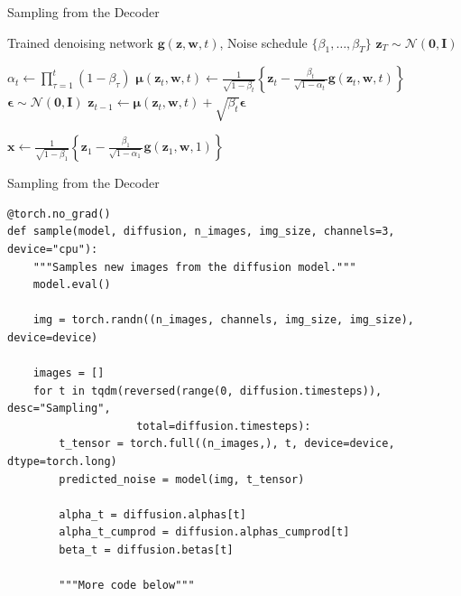\documentclass[aspectratio=169,xcolor=dvipsnames]{beamer}
\theoremstyle{named}
\newcommand{\modelg}{\mathbf{g}}
\begin{document}
\begin{frame}{Sampling from the Decoder}

\begin{algorithmic}[1]
    \Require Trained denoising network $\modelg(\mathbf{z}, \mathbf{w}, t)$, Noise schedule $\{\beta_1, \dots, \beta_T\}$
    \State $\mathbf{z}_T \sim \mathcal{N}(\mathbf{0}, \mathbf{I})$ 

    \Statex

        \State $\alpha_t \gets \prod_{\tau=1}^{t} (1 - \beta_\tau)$ 
        \Statex {}
        \State $\boldsymbol{\mu}(\mathbf{z}_t, \mathbf{w}, t) \gets \frac{1}{\sqrt{1-\beta_t}}\left\{\mathbf{z}_t - \frac{\beta_t}{\sqrt{1-\alpha_t}}\modelg(\mathbf{z}_t, \mathbf{w}, t)\right\}$
        \State $\boldsymbol{\epsilon} \sim \mathcal{N}(\mathbf{0}, \mathbf{I})$ 
        \State $\mathbf{z}_{t-1} \gets \boldsymbol{\mu}(\mathbf{z}_t, \mathbf{w}, t) + \sqrt{\beta_t}\boldsymbol{\epsilon}$ 
    \EndFor

    \Statex

    \State $\mathbf{x} \gets \frac{1}{\sqrt{1-\beta_1}}\left\{\mathbf{z}_1 - \frac{\beta_1}{\sqrt{1-\alpha_1}}\modelg(\mathbf{z}_1, \mathbf{w}, 1)\right\}$ 
    
\end{algorithmic}

\end{frame}


\begin{frame}[fragile]{Sampling from the Decoder}
\scriptsize
\begin{lstlisting}
@torch.no_grad()
def sample(model, diffusion, n_images, img_size, channels=3, device="cpu"):
    """Samples new images from the diffusion model."""
    model.eval()
    
    img = torch.randn((n_images, channels, img_size, img_size), device=device)
    
    images = []
    for t in tqdm(reversed(range(0, diffusion.timesteps)), desc="Sampling", 
                    total=diffusion.timesteps):
        t_tensor = torch.full((n_images,), t, device=device, dtype=torch.long)
        predicted_noise = model(img, t_tensor)

        alpha_t = diffusion.alphas[t]
        alpha_t_cumprod = diffusion.alphas_cumprod[t]
        beta_t = diffusion.betas[t]

        """More code below"""
\end{lstlisting}

\end{frame}
\end{document}

